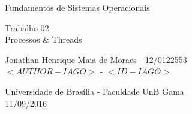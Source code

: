\begin{titlepage}
\begin{center}

	{\LARGE Fundamentos de Sistemas Operacionais}
	\\
	\vspace*{\fill}

	{\LARGE Trabalho 02 \\ \vspace{0.3in} Processos \& Threads}
	\\
	\vspace*{\fill}

	{\large Jonathan Henrique Maia de Moraes - 12/0122553
	\\ $<AUTHOR-IAGO>$ - $<ID-IAGO>$}

	\vspace{1in}

	{\large Universidade de Brasília - Faculdade UnB Gama
	\\ 11/09/2016}
\end{center}
\end{titlepage}
